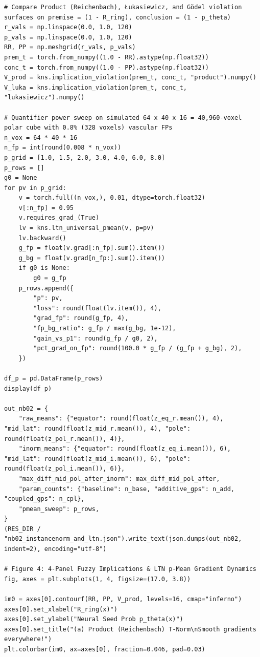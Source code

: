 \documentclass[10pt,a4paper]{article}
\renewcommand{\_}{\origunderscore\allowbreak}
\begin{document}
\begin{codebox}
\begin{lstlisting}[style=pybmed]
# Compare Product (Reichenbach), Łukasiewicz, and Gödel violation surfaces on premise = (1 - R_ring), conclusion = (1 - p_theta)
r_vals = np.linspace(0.0, 1.0, 120)
p_vals = np.linspace(0.0, 1.0, 120)
RR, PP = np.meshgrid(r_vals, p_vals)
prem_t = torch.from_numpy((1.0 - RR).astype(np.float32))
conc_t = torch.from_numpy((1.0 - PP).astype(np.float32))
V_prod = kns.implication_violation(prem_t, conc_t, "product").numpy()
V_luka = kns.implication_violation(prem_t, conc_t, "lukasiewicz").numpy()

# Quantifier power sweep on simulated 64 x 40 x 16 = 40,960-voxel polar cube with 0.8% (328 voxels) vascular FPs
n_vox = 64 * 40 * 16
n_fp = int(round(0.008 * n_vox))
p_grid = [1.0, 1.5, 2.0, 3.0, 4.0, 6.0, 8.0]
p_rows = []
g0 = None
for pv in p_grid:
    v = torch.full((n_vox,), 0.01, dtype=torch.float32)
    v[:n_fp] = 0.95
    v.requires_grad_(True)
    lv = kns.ltn_universal_pmean(v, p=pv)
    lv.backward()
    g_fp = float(v.grad[:n_fp].sum().item())
    g_bg = float(v.grad[n_fp:].sum().item())
    if g0 is None:
        g0 = g_fp
    p_rows.append({
        "p": pv,
        "loss": round(float(lv.item()), 4),
        "grad_fp": round(g_fp, 4),
        "fp_bg_ratio": g_fp / max(g_bg, 1e-12),
        "gain_vs_p1": round(g_fp / g0, 2),
        "pct_grad_on_fp": round(100.0 * g_fp / (g_fp + g_bg), 2),
    })

df_p = pd.DataFrame(p_rows)
display(df_p)

out_nb02 = {
    "raw_means": {"equator": round(float(z_eq_r.mean()), 4), "mid_lat": round(float(z_mid_r.mean()), 4), "pole": round(float(z_pol_r.mean()), 4)},
    "inorm_means": {"equator": round(float(z_eq_i.mean()), 6), "mid_lat": round(float(z_mid_i.mean()), 6), "pole": round(float(z_pol_i.mean()), 6)},
    "max_diff_mid_pol_after_inorm": max_diff_mid_pol_after,
    "param_counts": {"baseline": n_base, "additive_gps": n_add, "coupled_gps": n_cpl},
    "pmean_sweep": p_rows,
}
(RES_DIR / "nb02_instancenorm_and_ltn.json").write_text(json.dumps(out_nb02, indent=2), encoding="utf-8")

# Figure 4: 4-Panel Fuzzy Implications & LTN p-Mean Gradient Dynamics
fig, axes = plt.subplots(1, 4, figsize=(17.0, 3.8))

im0 = axes[0].contourf(RR, PP, V_prod, levels=16, cmap="inferno")
axes[0].set_xlabel("R_ring(x)")
axes[0].set_ylabel("Neural Seed Prob p_theta(x)")
axes[0].set_title("(a) Product (Reichenbach) T-Norm\nSmooth gradients everywhere!")
plt.colorbar(im0, ax=axes[0], fraction=0.046, pad=0.03)


\end{lstlisting}
\end{codebox}
\end{document}
